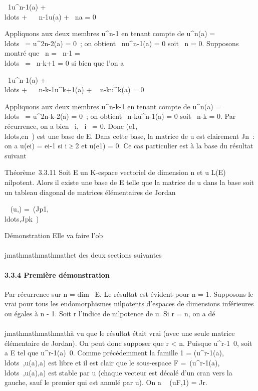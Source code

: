 \lambda~1u^n-1(a) +
\\ldots + \lambda~~
n-1u(a) + \lambda~na = 0

Appliquons aux deux membres u^n-1 en tenant compte de
u^n(a) =
\\ldots~ =
u^2n-2(a) = 0~; on obtient \lambda~nu^n-1(a) =
0 soit \lambda~n = 0. Supposons montré que \lambda~n =
\lambda~n-1 =
\\ldots~ =
\lambda~n-k+1 = 0 si bien que l'on a

\lambda~1u^n-1(a) +
\\ldots + \lambda~~
n-k-1u^k+1(a) + \lambda~ n-ku^k(a) = 0

Appliquons aux deux membres u^n-k-1 en tenant compte de
u^n(a) =
\\ldots~ =
u^2n-k-2(a) = 0~; on obtient
\lambda~n-ku^n-1(a) = 0 soit \lambda~n-k = 0. Par
récurrence, on a bien \forall~i, \lambda~i~ = 0.
Donc
(e1,\\ldots,en~)
est une base de E. Dans cette base, la matrice de u est clairement
Jn~: on a u(ei) = ei-1 si i ≥ 2 et
u(e1) = 0. Ce cas particulier est à la base du résultat
suivant

Théorème~3.3.11 Soit E un K-espace vectoriel de dimension n et u \in L(E)
nilpotent. Alors il existe une base  de E telle que la matrice de u
dans la base  soit un tableau diagonal de matrices élémentaires de
Jordan

\mathrmMat~ (u,)
=\
\mathrmdiag(Jp1,\\ldots,Jpk~)

Démonstration Elle va faire l'ob\\\\jmathmathmathmathet des deux sections suivantes

\paragraph{3.3.4 Première démonstration}

Par récurrence sur n = dim~ E. Le résultat est
évident pour n = 1. Supposons le vrai pour tous les endomorphismes
nilpotents d'espaces de dimensions inférieures ou égales à n - 1. Soit r
l'indice de nilpotence de u. Si r = n, on a dé\\\\jmathmathmathmathà vu que le résultat
était vrai (avec une seule matrice élémentaire de Jordan). On peut donc
supposer que r \textless{} n. Puisque
u^r-1\neq~0, soit a \in E tel que
u^r-1(a)\neq~0. Comme précédemment la
famille 1 =
(u^r-1(a),\\ldots~,u(a),a)
est libre et il est clair que le sous-espace F =\
\mathrmVect(u^r-1(a),\\ldots~,u(a),a)
est stable par u (chaque vecteur est décalé d'un cran vers la gauche,
sauf le premier qui est annulé par u). On a
\mathrmMat~
(u\textbar{}F,1) = Jr.

